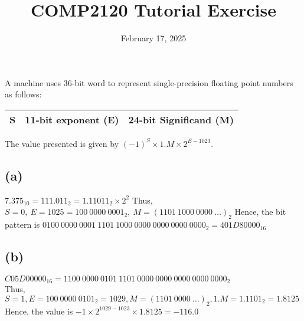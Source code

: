 \documentclass{exam}
\title{COMP2120 Tutorial Exercise}
\date{February 17, 2025}
\begin{document}
\maketitle
A machine uses 36-bit word to represent single-precision floating point numbers as follows:
\begin{table}[!ht]
    \centering
    \begin{tabular}{|c|c|c|}
        \hline
        S & 11-bit exponent (E) & 24-bit Significand (M) \\ \hline
    \end{tabular}
\end{table}


The value presented is given by $(-1)^{S} \times 1.M \times 2^{E-1023}$.


\subsection*{(a)}
$7.375_{10} = 111.011_{2} = 1.11011_{2} \times 2^{2}$
Thus, $S = 0,\ E = 1025 = 100\ 0000\ 0001_{2},\ M = (1101\ 1000\ 0000\ \dots)_{2}$
Hence, the bit pattern is $0100\ 0000\ 0001\ 1101\ 1000\ 0000\ 0000\ 0000\ 0000_{2} = 401D80000_{16}$

\subsection*{(b)}
$C05D00000_{16} = 1100\ 0000\ 0101\ 1101\ 0000\ 0000\ 0000\ 0000\ 0000_{2}$ \\
Thus, $S = 1, E = 100\ 0000\ 0101_{2} = 1029, M = (1101\ 0000\ \dots)_{2}, 1.M = 1.1101_{2} = 1.8125$ \\
Hence, the value is $-1 \times 2^{1029 - 1023} \times 1.8125 = -116.0$
\end{document}
